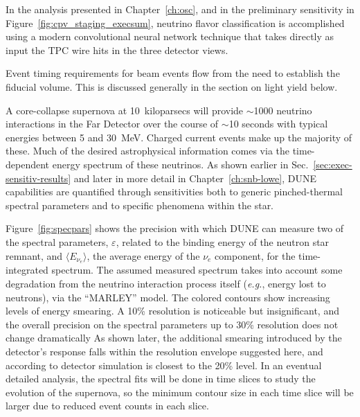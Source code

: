 In the analysis presented in Chapter~\ref{ch:osc}, and in
the preliminary  sensitivity in
Figure~\ref{fig:cpv_staging_execsum}, neutrino flavor classification
is accomplished using a modern convolutional neural network
technique that takes directly as input the TPC wire hits
in the three detector views.

Event timing requirements for beam events flow from the
need to establish the fiducial volume.  This is discussed
generally in the section on light yield below.

  A core-collapse
supernova at 10~kiloparsecs will provide $\sim$1000 neutrino
interactions in the Far Detector over the course of
$\sim$10 seconds with typical energies between 5 and 30~MeV.
Charged current \nue{} events make up the majority of these.
Much of the desired astrophysical information comes via the
time-dependent energy spectrum of these neutrinos.  As shown
earlier in Sec.~\ref{sec:exec-sensitiv-results} and later
in more detail in Chapter~\ref{ch:snb-lowe},
DUNE capabilities are quantified through sensitivities
both to generic pinched-thermal spectral parameters
and to
specific phenomena within the star.

Figure~\ref{fig:specpars} shows the precision with which DUNE
can measure two of the spectral parameters, $\varepsilon$, related to
the binding energy of the neutron star remnant, and $\langle
E_{\nu_e}\rangle$, the average energy of the $\nu_e$ component, for the
time-integrated spectrum.
The assumed measured spectrum takes into account some degradation
from the neutrino interaction process itself 
({\em e.g.}, energy lost to neutrons), via the ``MARLEY'' model.
The colored contours show increasing levels of energy smearing.
A 10\% resolution is noticeable but insignificant, and the
overall precision on the spectral parameters up to 30\%
resolution does not change dramatically
As shown later,
the additional smearing introduced by the detector's response
falls within the resolution envelope suggested here, and according to
detector simulation is closest to the 20\% level.
In an eventual detailed analysis, the spectral
fits will be done in time slices to study the evolution of
the supernova, so the minimum contour size in each time slice
will be larger due to reduced event counts in each slice.


